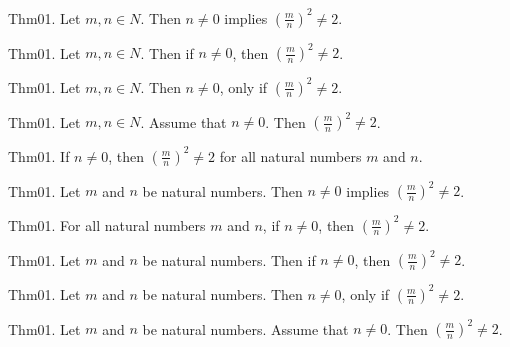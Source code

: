 \documentclass{article}
\begin{document}
Thm01. Let $m , n \in N$. Then $n \neq 0$ implies $(\frac{ m}{n})^ {2}\neq 2$.

Thm01. Let $m , n \in N$. Then if $n \neq 0$, then $(\frac{ m}{n})^ {2}\neq 2$.

Thm01. Let $m , n \in N$. Then $n \neq 0$, only if $(\frac{ m}{n})^ {2}\neq 2$.

Thm01. Let $m , n \in N$. Assume that $n \neq 0$. Then $(\frac{ m}{n})^ {2}\neq 2$.

Thm01. If $n \neq 0$, then $(\frac{ m}{n})^ {2}\neq 2$ for all natural numbers $m$ and $n$.

Thm01. Let $m$ and $n$ be natural numbers. Then $n \neq 0$ implies $(\frac{ m}{n})^ {2}\neq 2$.

Thm01. For all natural numbers $m$ and $n$, if $n \neq 0$, then $(\frac{ m}{n})^ {2}\neq 2$.

Thm01. Let $m$ and $n$ be natural numbers. Then if $n \neq 0$, then $(\frac{ m}{n})^ {2}\neq 2$.

Thm01. Let $m$ and $n$ be natural numbers. Then $n \neq 0$, only if $(\frac{ m}{n})^ {2}\neq 2$.

Thm01. Let $m$ and $n$ be natural numbers. Assume that $n \neq 0$. Then $(\frac{ m}{n})^ {2}\neq 2$.
\end{document}

